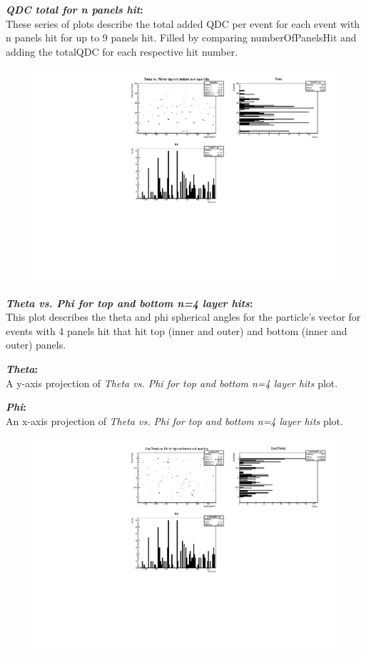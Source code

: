 \documentclass[a4paper,12pt]{article}
\begin{document}
\textbf{\emph{QDC total for n panels hit}:} \\
These series of plots describe the total added QDC per event for each event with n panels hit for up to 9 panels hit. Filled by comparing numberOfPanelsHit and adding the totalQDC for each respective hit number.

\pagebreak
\begin{figure}[h]
\centering
\includegraphics[scale=0.8]{thetaPhi.pdf}
\end{figure}

\textbf{\emph{Theta vs. Phi for top and bottom n=4 layer hits}:} \\
This plot describes the theta and phi spherical angles for the particle's vector for events with 4 panels hit that hit top (inner and outer) and bottom (inner and outer) panels.

\textbf{\emph{Theta}:} \\
A y-axis projection of \emph{Theta vs. Phi for top and bottom n=4 layer hits} plot.

\textbf{\emph{Phi}:} \\
An x-axis projection of \emph{Theta vs. Phi for top and bottom n=4 layer hits} plot.

\pagebreak
\begin{figure}[h]
\centering
\includegraphics[scale=0.8]{cosThetaPhi.pdf}
\end{figure}
\end{document}
